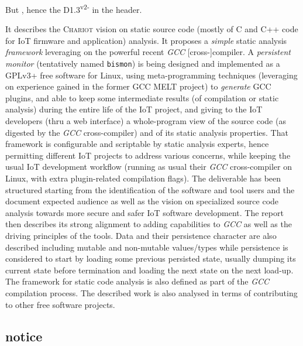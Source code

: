 \documentclass[11pt,a4paper,svgnames]{article}
\begin{document}
\begin{titlepage}
But {}, hence the
D1.3\textsuperscript{v2-} in the header.

It describes the \textsc{Chariot} vision on static source code (mostly
of C and C++ code for IoT firmware and application) analysis. It
proposes a \emph{simple} static analysis \emph{framework} leveraging
on the powerful recent \emph{GCC} [cross-]compiler. A \emph{persistent
  monitor} (tentatively named \texttt{bismon}) is being designed and
implemented as a GPLv3+ free software for Linux, using
meta-programming techniques (leveraging on experience gained in the
former GCC MELT project) to \emph{generate} GCC plugins, and able to
keep some intermediate results (of compilation or static analysis)
during the entire life of the IoT project, and giving to the IoT
developers (thru a web interface) a whole-program view of the source
code (as digested by the \emph{GCC} cross-compiler) and of its static
analysis properties. That framework is configurable and scriptable by
static analysis experts, hence permitting different IoT projects to
address various concerns, while keeping the usual IoT development
workflow (running as usual their \emph{GCC} cross-compiler on Linux,
with extra plugin-related compilation flags).  The deliverable has
been structured starting from the identification of the software and
tool users and the document expected audience as well as the vision on
specialized source code analysis towards more secure and safer IoT
software development. The report then describes its strong alignment
to adding capabilities to \emph{GCC} as well as the driving principles of the
tools. Data and their persistence character are also described
including mutable and non-mutable values/types while persistence is
considered to start by loading some previous persisted state, usually
dumping its current state before termination and loading the next
state on the next load-up. The framework for static code analysis is
also defined as part of the \emph{GCC} compilation process. The described
work is also analysed in terms of contributing to other free software
projects.

\medskip

\bigskip

\subsection*{notice}


\end{titlepage}
\end{document}
